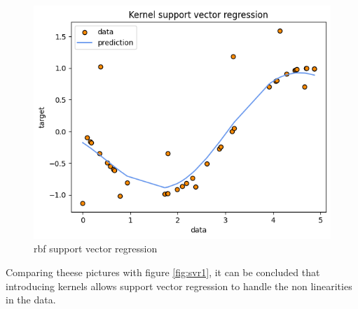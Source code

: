 \begin{figure}
    \includegraphics[width=\textwidth]{images/svr3.png}
    \caption{rbf support vector regression}
    \label{fig:svr3}
\end{figure}
Comparing theese pictures with figure \ref{fig:svr1}, it can be concluded that introducing kernels allows support vector regression to handle the non linearities in the data.